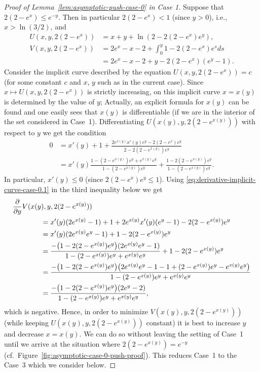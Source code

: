 \documentclass[a4paper]{amsart} %
\theoremstyle{definition}
\theoremstyle{remark}
\numberwithin{equation}{section}
\newcommand*{\XXXasymptoticDenominator}{V}
\newcommand*{\XXXasymptoticNominator}{U}
\begin{document}
	
    \begin{proof}[Proof of Lemma~\ref{lem:asymptotic-push-case-0} in Case 1]
	Suppose that $2(2-e^x) \leq e^{-y}$.
	Then in particular $2(2-e^x) < 1$ (since $y>0$), i.e.,  $x> \ln(3/2)$,
	and
	\begin{align*}
	\XXXasymptoticNominator(x,y,2(2-e^x)) &= x + y + \ln(2-2(2-e^x)e^y),\\
	\XXXasymptoticDenominator(x,y,2(2-e^x)) &= 2e^x - x -2 + \int_{0}^{y} 1 -  2(2-e^x)  e^{s} ds\\
	& = 2e^x - x- 2 + y - 2(2-e^x)(e^y-1).
\end{align*}
Consider the implicit curve described by the equation $\XXXasymptoticNominator(x,y,2(2-e^x)) = c$
(for some constant $c$ and $x$, $y$ such as in the current case).
Since $x\mapsto \XXXasymptoticNominator(x,y,2(2-e^x)) $ is strictly increasing, on this implicit curve
	$x=x(y)$ is determined by the value of $y$;
	Actually, an explicit formula for $x(y)$ can be found
	and one easily sees that $x(y)$ is differentiable 
	(if we are in the interior of the set considered in Case~1).
	Differentiating $\XXXasymptoticNominator(x(y),y,2(2-e^{x(y)}))$
	 with respect to $y$ we
	get the condition
	\begin{align}
	\label{eq:derivative-implicit-curve-case-0.1}
	0 &= x'(y) + 1 + \frac{2e^{x(y)} x'(y) e^y - 2(2-e^x) e^y}{2-2(2-e^{x(y)})e^y}
	\\
	&= x'(y) \frac{1 - (2 - e^{x(y)}) e^y + e^{x(y)} e^y}{1 - (2 - e^{x(y)}) e^y} + \frac{1 - 2(2 - e^{x(y)}) e^y}{1 - (2 - e^{x(y)}) e^y}.\nonumber
	\end{align}
	In particular, $x'(y) \leq 0$ (since $2(2-e^{x}) e^y \leq 1$).
	Using \eqref{eq:derivative-implicit-curve-case-0.1} in the third inequality below we get
	\begin{align*}
	\MoveEqLeft[4]
	\frac{\partial}{\partial y} \XXXasymptoticDenominator(x(y), y, 2(2-e^{x(y)})) \\
	&= x'(y)(2e^{x(y)} - 1) + 1 
	+ 2e^{x(y)}x'(y) (e^y - 1) - 2(2-e^{x(y)}) e^y \\
	&= x'(y)(2e^{x(y)}e^y - 1) + 1  - 2(2-e^{x(y)}) e^y \\
	&= \frac{-\bigl(1 - 2(2 - e^{x(y)}) e^y\bigr)(2e^{x(y)}e^y - 1)}{1 - (2 - e^{x(y)}) e^y + e^{x(y)} e^y} + 1  - 2(2-e^{x(y)}) e^y \\	
	&= \frac{-\bigl(1 - 2(2 - e^{x(y)}) e^y\bigr)\bigl(2e^{x(y)}e^y - 1     - 1 + (2 - e^{x(y)}) e^y - e^{x(y)} e^y\bigr)}{1 - (2 - e^{x(y)}) e^y + e^{x(y)} e^y}  \\	
	&= \frac{-\bigl(1 - 2(2 - e^{x(y)}) e^y\bigr)(2 e^y - 2)}{1 - (2 - e^{x(y)}) e^y + e^{x(y)} e^y} ,	
	\end{align*}
	which is negative. 
	Hence, in order to minimize $\XXXasymptoticDenominator(x(y), y, 2(2-e^{x(y)}))$
	(while keeping $\XXXasymptoticNominator(x(y), y, 2(2-e^{x(y)}))$ constant)
	it is best to increase $y$ and decrease $x=x(y)$.
	We can do so without leaving the setting of Case~1
	 until we arrive at the situation where 
	$ 2(2-e^{x(y)}) = e^{-y}$
	(cf.\ Figure~\ref{fig:asymptotic-case-0-push-proof}).
	This reduces Case~1 to the Case~3 which we  consider below.
	\end{proof}
\end{document}
